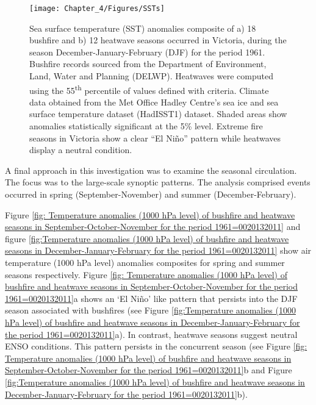 \begin{figure}[h]
\noindent \begin{centering}
\texttt{[image: Chapter\_4/Figures/SSTs]}
\par\end{centering}

\caption[Sea surface temperature (SST) anomalies composite of a) 18 bushfire
and b) 12 heatwave seasons occurred in Victoria, during the season December-January-February
(DJF) for the period 1961]{Sea surface temperature (SST) anomalies composite of a) 18 bushfire
and b) 12 heatwave seasons occurred in Victoria, during the season December-January-February
(DJF) for the period 1961. Bushfire records sourced
from the Department of Environment, Land, Water and Planning (DELWP).
Heatwaves were computed using the 55\protect\textsuperscript{th}
percentile of values defined with \citet{Nairn2009} criteria. Climate
data obtained from the Met Office Hadley Centre\textquoteright s sea
ice and sea surface temperature dataset (HadISST1) dataset. Shaded
areas show anomalies statistically significant at the 5\% level. Extreme
fire seasons in Victoria show a clear ``El Ni\~no'' pattern while
heatwaves display a neutral condition. \label{fig:Sea surface temperature anomalies of bushfire and heatwave seasons in December-January-February for the period 1961=0020132011}}


\end{figure}


A final approach in this investigation was to examine the seasonal
circulation. The focus was to the large-scale synoptic patterns. The
analysis comprised events occurred in spring (September-November)
and summer (December-February). 

Figure \ref{fig: Temperature anomalies (1000 hPa level) of bushfire and heatwave seasons in September-October-November for the period 1961=0020132011}
and figure \ref{fig:Temperature anomalies (1000 hPa level) of bushfire and heatwave seasons in December-January-February for the period 1961=0020132011}
show air temperature (1000 hPa level) anomalies composites for spring
and summer seasons respectively. Figure \ref{fig: Temperature anomalies (1000 hPa level) of bushfire and heatwave seasons in September-October-November for the period 1961=0020132011}a
shows an \textquoteleft El Ni\~no\textquoteright{} like pattern that
persists into the DJF season associated with bushfires (see Figure
\ref{fig:Temperature anomalies (1000 hPa level) of bushfire and heatwave seasons in December-January-February for the period 1961=0020132011}a).
In contrast, heatwave seasons suggest neutral ENSO conditions. This
pattern persists in the concurrent season (see Figure \ref{fig: Temperature anomalies (1000 hPa level) of bushfire and heatwave seasons in September-October-November for the period 1961=0020132011}b
and Figure \ref{fig:Temperature anomalies (1000 hPa level) of bushfire and heatwave seasons in December-January-February for the period 1961=0020132011}b). 

